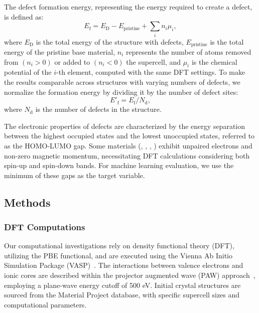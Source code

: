     The defect formation energy, representing the energy required to create a defect, is defined as:
    \begin{equation}
        \label{eq:eform}
        E_\text{f} = E_\text{D} - E_\text{pristine} + \sum_{i}{n_i \mu_i},
    \end{equation}
    where $E_\text{D}$ is the total energy of the structure with defects, $E_\text{pristine}$ is the total energy of the pristine base material, $n_i$ represents the number of atoms removed from $(n_i > 0)$ or added to $(n_i < 0)$ the supercell, and $\mu_i$ is the chemical potential of the $i$-th element, computed with the same DFT settings. To make the results comparable across structures with varying numbers of defects, we normalize the formation energy by dividing it by the number of defect sites:
    \begin{equation}
        E'_\text{f} = E_\text{f} / N_\text{d},
    \end{equation}
    where $N_\text{d}$ is the number of defects in the structure.
    
    The electronic properties of defects are characterized by the energy separation between the highest occupied states and the lowest unoccupied states, referred to as the HOMO-LUMO gap. Some materials (, , , ) exhibit unpaired electrons and non-zero magnetic momentum, necessitating DFT calculations considering both spin-up and spin-down bands. For machine learning evaluation, we use the minimum of these gaps as the target variable.
    
    
    


\subsection{Methods}

\subsubsection{DFT Computations}
\label{subsec:methods:dft}
Our computational investigations rely on density functional theory (DFT), utilizing the PBE functional, and are executed using the Vienna Ab Initio Simulation Package (VASP)~\cite{vasp-gga1996, vasp-basis1996, vasp-ab1994}. The interactions between valence electrons and ionic cores are described within the projector augmented wave (PAW) approach~\cite{vasp-paw1994}, employing a plane-wave energy cutoff of 500 eV. Initial crystal structures are sourced from the Material Project database, with specific supercell sizes and computational parameters.

